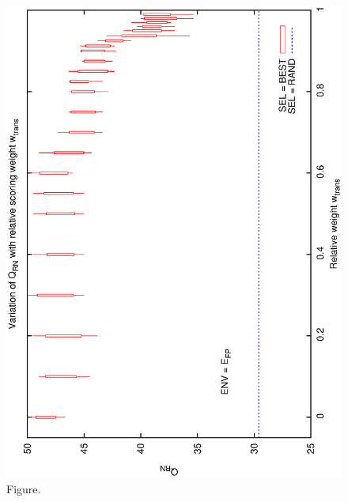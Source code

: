 \documentclass[12pt,a4paper]{article}
\begin{document}
\begin{figure}[htbp]
 \begin{center}
  \includegraphics[scale=1.0, angle=0]{figures/cs1_dw1_rn.eps}
 \end{center}
  \caption[Figure.]
{Figure.}
\end{figure}
\clearpage
\end{document}
